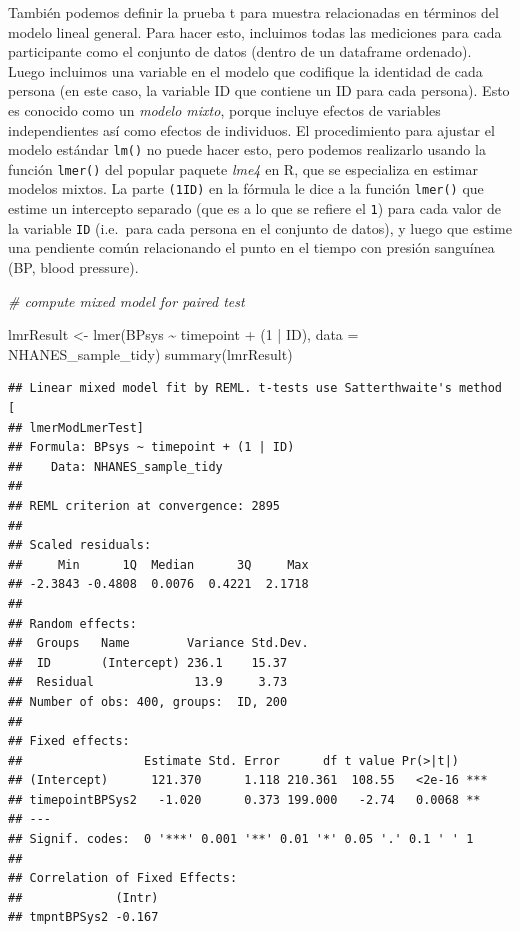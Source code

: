 \documentclass[
  12pt,
]{book}
\newenvironment{Shaded}{\begin{snugshade}}{\end{snugshade}}
\newcommand{\AttributeTok}[1]{\textcolor[rgb]{0.77,0.63,0.00}{#1}}
\newcommand{\CommentTok}[1]{\textcolor[rgb]{0.56,0.35,0.01}{\textit{#1}}}
\newcommand{\DecValTok}[1]{\textcolor[rgb]{0.00,0.00,0.81}{#1}}
\newcommand{\FunctionTok}[1]{\textcolor[rgb]{0.00,0.00,0.00}{#1}}
\newcommand{\NormalTok}[1]{#1}
\newcommand{\OtherTok}[1]{\textcolor[rgb]{0.56,0.35,0.01}{#1}}
\newcommand{\SpecialCharTok}[1]{\textcolor[rgb]{0.00,0.00,0.00}{#1}}
\begin{document}
También podemos definir la prueba t para muestra relacionadas en términos del modelo lineal general. Para hacer esto, incluimos todas las mediciones para cada participante como el conjunto de datos (dentro de un dataframe ordenado). Luego incluimos una variable en el modelo que codifique la identidad de cada persona (en este caso, la variable ID que contiene un ID para cada persona). Esto es conocido como un \emph{modelo mixto}, porque incluye efectos de variables independientes así como efectos de individuos. El procedimiento para ajustar el modelo estándar \texttt{lm()} no puede hacer esto, pero podemos realizarlo usando la función \texttt{lmer()} del popular paquete \emph{lme4} en R, que se especializa en estimar modelos mixtos. La parte \texttt{(1\textbar{}ID)} en la fórmula le dice a la función \texttt{lmer()} que estime un intercepto separado (que es a lo que se refiere el \texttt{1}) para cada valor de la variable \texttt{ID} (i.e.~para cada persona en el conjunto de datos), y luego que estime una pendiente común relacionando el punto en el tiempo con presión sanguínea (BP, blood pressure).

\begin{Shaded}
\begin{Highlighting}[]
\CommentTok{\# compute mixed model for paired test}

\NormalTok{lmrResult }\OtherTok{\textless{}{-}} \FunctionTok{lmer}\NormalTok{(BPsys }\SpecialCharTok{\textasciitilde{}}\NormalTok{ timepoint }\SpecialCharTok{+}\NormalTok{ (}\DecValTok{1} \SpecialCharTok{|}\NormalTok{ ID), }
                  \AttributeTok{data =}\NormalTok{ NHANES\_sample\_tidy)}
\FunctionTok{summary}\NormalTok{(lmrResult)}
\end{Highlighting}
\end{Shaded}

\begin{verbatim}
## Linear mixed model fit by REML. t-tests use Satterthwaite's method [
## lmerModLmerTest]
## Formula: BPsys ~ timepoint + (1 | ID)
##    Data: NHANES_sample_tidy
## 
## REML criterion at convergence: 2895
## 
## Scaled residuals: 
##     Min      1Q  Median      3Q     Max 
## -2.3843 -0.4808  0.0076  0.4221  2.1718 
## 
## Random effects:
##  Groups   Name        Variance Std.Dev.
##  ID       (Intercept) 236.1    15.37   
##  Residual              13.9     3.73   
## Number of obs: 400, groups:  ID, 200
## 
## Fixed effects:
##                 Estimate Std. Error      df t value Pr(>|t|)    
## (Intercept)      121.370      1.118 210.361  108.55   <2e-16 ***
## timepointBPSys2   -1.020      0.373 199.000   -2.74   0.0068 ** 
## ---
## Signif. codes:  0 '***' 0.001 '**' 0.01 '*' 0.05 '.' 0.1 ' ' 1
## 
## Correlation of Fixed Effects:
##             (Intr)
## tmpntBPSys2 -0.167
\end{verbatim}
\end{document}
